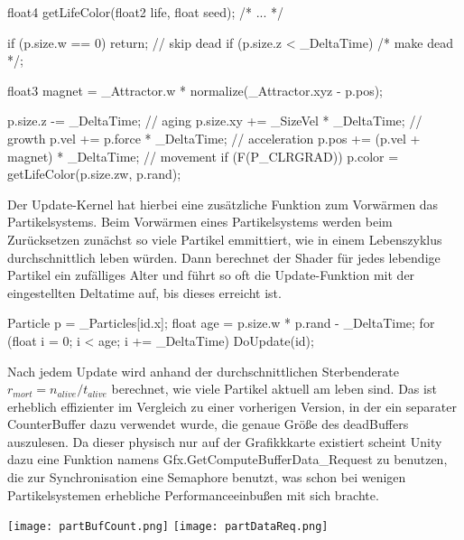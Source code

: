 \begin{hlsl}[caption=Compute Update]
float4 getLifeColor(float2 life, float seed);
/* ... */

if (p.size.w == 0) return; // skip dead
if (p.size.z < _DeltaTime) /* make dead */;

float3 magnet = _Attractor.w * normalize(_Attractor.xyz - p.pos);

p.size.z -= _DeltaTime;             // aging
p.size.xy += _SizeVel * _DeltaTime; // growth
p.vel += p.force * _DeltaTime;      // acceleration
p.pos += (p.vel + magnet) * _DeltaTime; // movement
if (F(P_CLRGRAD)) p.color = getLifeColor(p.size.zw, p.rand);
\end{hlsl}

Der Update-Kernel hat hierbei eine zusätzliche Funktion zum Vorwärmen das Partikelsystems. Beim Vorwärmen eines Partikelsystems werden beim Zurücksetzen zunächst so viele Partikel emmittiert, wie in einem Lebenszyklus durchschnittlich leben würden. Dann berechnet der Shader für jedes lebendige Partikel ein zufälliges Alter und führt so oft die Update-Funktion mit der eingestellten Deltatime auf, bis dieses erreicht ist.

\begin{hlsl}[caption=Compute Prewarm Update Kernel]
Particle p = _Particles[id.x];
float age = p.size.w * p.rand - _DeltaTime;
for (float i = 0; i < age; i += _DeltaTime) DoUpdate(id);
\end{hlsl}

Nach jedem Update wird anhand der durchschnittlichen Sterbenderate $r_{mort} = n_{alive} / t_{alive}$ berechnet, wie viele Partikel aktuell am leben sind. Das ist erheblich effizienter im Vergleich zu einer vorherigen Version, in der ein separater CounterBuffer dazu verwendet wurde, die genaue Grö{\ss}e des deadBuffers auszulesen. Da dieser physisch nur auf der Grafikkkarte existiert scheint Unity dazu eine Funktion namens Gfx.GetComputeBufferData\_Request zu benutzen, die zur Synchronisation eine Semaphore benutzt, was schon bei wenigen Partikelsystemen erhebliche Performanceeinbu{\ss}en mit sich brachte.

\begin{minipage}{0.95\linewidth}
\vspace{5mm}
\captionsetup{type=figure}
\texttt{[image: partBufCount.png]}
\texttt{[image: partDataReq.png]}
\end{minipage}

